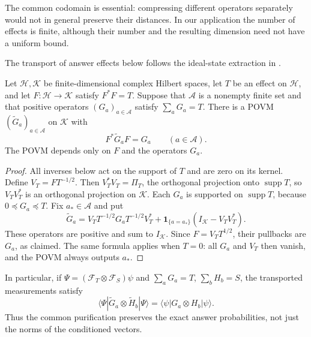 The common codomain is essential: compressing different operators
separately would not in general preserve their distances.  In our
application the number of effects is finite, although their number and
the resulting dimension need not have a uniform bound.

The transport of answer effects below follows the ideal-state extraction
in \cite[Chapter~6, Lemma~3.2 and Appendix~A.1]{tenadvances2026}.

\begin{lemma}
\label{lem:measurement-transport}
Let $\mathcal H,\mathcal K$ be finite-dimensional complex Hilbert spaces,
let $T$ be an effect on $\mathcal H$, and let
$F:\mathcal H\to\mathcal K$ satisfy $F^*F=T$.
Suppose that $\mathcal A$ is a nonempty finite set and that positive
operators $(G_a)_{a\in\mathcal A}$ satisfy $\sum_aG_a=T$.
There is a POVM $(\widetilde G_a)_{a\in\mathcal A}$ on $\mathcal K$
with
\begin{equation}
 F^*\widetilde G_aF=G_a\qquad(a\in\mathcal A).
 \label{eq:measurement-pullback}
\end{equation}
The POVM depends only on $F$ and the operators $G_a$.
\end{lemma}

\begin{proof}
All inverses below act on the support of $T$ and are zero on its
kernel.  Define $V_T=FT^{-1/2}$.  Then
$V_T^*V_T=\Pi_T$, the orthogonal projection onto
$\operatorname{supp}T$, so $V_TV_T^*$ is an orthogonal projection
on $\mathcal K$.  Each $G_a$ is supported on
$\operatorname{supp}T$, because $0\preceq G_a\preceq T$.
Fix $a_*\in\mathcal A$ and put
\[
 \widetilde G_a
 =V_TT^{-1/2}G_aT^{-1/2}V_T^*
   +\mathbf1_{\{a=a_*\}}(I_{\mathcal K}-V_TV_T^*).
\]
These operators are positive and sum to $I_{\mathcal K}$.
Since $F=V_TT^{1/2}$, their pullbacks are $G_a$, as claimed.
The same formula applies when $T=0$: all $G_a$ and $V_T$ then vanish,
and the POVM always outputs $a_*$.
\end{proof}

In particular, if $\Psi=(\mathcal F_T\otimes\mathcal F_S)\psi$
and $\sum_aG_a=T$, $\sum_bH_b=S$, the transported measurements satisfy
\begin{equation}
 \langle\Psi|\widetilde G_a\otimes\widetilde H_b|\Psi\rangle
   =\langle\psi|G_a\otimes H_b|\psi\rangle.
 \label{eq:joint-measurement-pullback}
\end{equation}
Thus the common purification preserves the exact answer probabilities,
not just the norms of the conditioned vectors.
